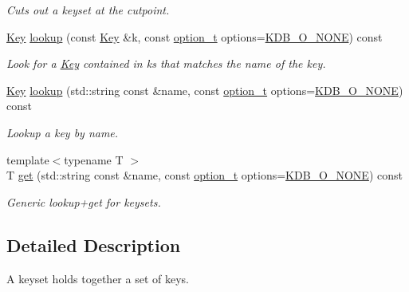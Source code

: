 \begin{DoxyCompactItemize}
\begin{DoxyCompactList}\small\item\em Cuts out a keyset at the cutpoint. \end{DoxyCompactList}\item 
\mbox{\hyperlink{classkdb_1_1Key}{Key}} \mbox{\hyperlink{classkdb_1_1KeySet_a78125fb19c6aebb0d8fc1a7238b78ace}{lookup}} (const \mbox{\hyperlink{classkdb_1_1Key}{Key}} \&k, const \mbox{\hyperlink{group__keyset_ga98a3d6a4016c9dad9cbd1a99a9c2a45a}{option\+\_\+t}} options=\mbox{\hyperlink{group__keyset_gga98a3d6a4016c9dad9cbd1a99a9c2a45aa00738455e0ae843c8720809d8287f370}{K\+D\+B\+\_\+\+O\+\_\+\+N\+O\+NE}}) const
\begin{DoxyCompactList}\small\item\em Look for a \mbox{\hyperlink{classkdb_1_1Key}{Key}} contained in {\ttfamily ks} that matches the name of the {\ttfamily key}. \end{DoxyCompactList}\item 
\mbox{\hyperlink{classkdb_1_1Key}{Key}} \mbox{\hyperlink{classkdb_1_1KeySet_ac17f3423b3a55821ffeab556af89a4f7}{lookup}} (std\+::string const \&name, const \mbox{\hyperlink{group__keyset_ga98a3d6a4016c9dad9cbd1a99a9c2a45a}{option\+\_\+t}} options=\mbox{\hyperlink{group__keyset_gga98a3d6a4016c9dad9cbd1a99a9c2a45aa00738455e0ae843c8720809d8287f370}{K\+D\+B\+\_\+\+O\+\_\+\+N\+O\+NE}}) const
\begin{DoxyCompactList}\small\item\em Lookup a key by name. \end{DoxyCompactList}\item 
{\footnotesize template$<$typename T $>$ }\\T \mbox{\hyperlink{classkdb_1_1KeySet_ad0b7d6498cf0b51ca6672704939a7f24}{get}} (std\+::string const \&name, const \mbox{\hyperlink{group__keyset_ga98a3d6a4016c9dad9cbd1a99a9c2a45a}{option\+\_\+t}} options=\mbox{\hyperlink{group__keyset_gga98a3d6a4016c9dad9cbd1a99a9c2a45aa00738455e0ae843c8720809d8287f370}{K\+D\+B\+\_\+\+O\+\_\+\+N\+O\+NE}}) const
\begin{DoxyCompactList}\small\item\em Generic lookup+get for keysets. \end{DoxyCompactList}\end{DoxyCompactItemize}


\subsection{Detailed Description}
A keyset holds together a set of keys. 

